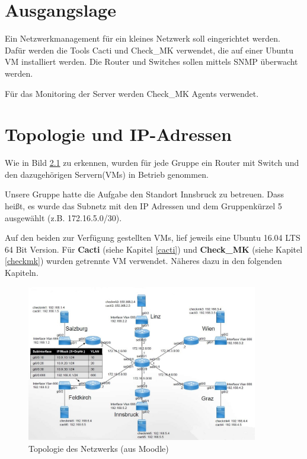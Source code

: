 \thispagestyle{standard}
\pagestyle{standard}
\chapter{Ausgangslage}
\label{ausgangs}

Ein Netzwerkmanagement für ein kleines Netzwerk soll eingerichtet werden. Dafür werden die Tools Cacti und Check\_MK verwendet, die auf einer Ubuntu \ac{VM} installiert werden. 
Die Router und Switches sollen mittels \ac{SNMP} überwacht werden. 

Für das Monitoring der Server werden Check\_MK Agents verwendet.


\chapter{Topologie und IP-Adressen}
\label{topo}


Wie in Bild \ref{img:topologie} zu erkennen, wurden für jede Gruppe ein Router mit Switch und den dazugehörigen Servern(\ac{VM}s) in Betrieb genommen.

Unsere Gruppe hatte die Aufgabe den Standort Innsbruck zu betreuen. Dass hei{\ss}t, es wurde das Subnetz mit den \ac{IP} Adressen und dem Gruppenkürzel 5 ausgewählt (z.B. 172.16.5.0/30).


Auf den beiden zur Verfügung gestellten \ac{VM}s, lief jeweils eine Ubuntu 16.04 LTS 64 Bit Version. Für \textbf{Cacti} (siehe Kapitel \ref{cacti}) und \textbf{Check\_MK} (siehe Kapitel \ref{checkmk}) wurden getrennte \ac{VM} verwendet. Näheres dazu in den folgenden Kapiteln.


\begin{figure}[H]
	\centering
	\includegraphics[width=0.9\textwidth]{img/Topologie.JPG}
	\caption{Topologie des Netzwerks (aus Moodle)}
	\label{img:topologie}
\end{figure}

